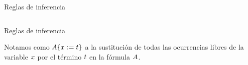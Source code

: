 \documentclass[xcolor={dvipsnames},spanish]{beamer}
\begin{document}
\begin{frame}{Reglas de inferencia}
    \begin{definition}
        \proofTreeLEM
        \begin{columns}
            \begin{column}{0.5\textwidth}
                \proofTreeFalseE
                \proofTreeTrueI
            \end{column}
            \begin{column}{0.5\textwidth}
                \proofTreeNotI
                \proofTreeNotE
            \end{column}
        \end{columns}
        \begin{columns}
            \begin{column}{0.5\textwidth}
                \proofTreeOrIOne
            \end{column}
            \begin{column}{0.5\textwidth}
                \proofTreeOrITwo
            \end{column}
        \end{columns}
        \proofTreeOrE
    \end{definition}
\end{frame}

\begin{frame}{Reglas de inferencia}
    \begin{definition}[Sustitución]
        Notamos como $A \{x := t\}$ a la sustitución de todas las
        ocurrencias libres de la variable $x$ por el término $t$ en la
        fórmula $A$.
    \end{definition}
    \begin{definition}
        \begin{columns}
            \proofTreeForallI
            \proofTreeForallE
        \end{columns}
        \proofTreeExistsI
        \proofTreeExistsE
    \end{definition}
\end{frame}
\end{document}
